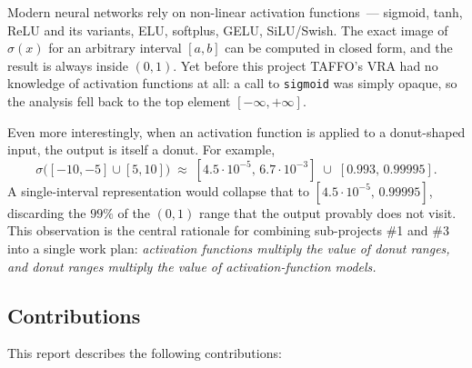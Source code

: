 \documentclass[11pt,a4paper]{article}
\theoremstyle{plain}
\begin{document}
Modern neural networks rely on non-linear activation functions~---
sigmoid, tanh, ReLU and its variants, ELU, softplus, GELU, SiLU/Swish.
The exact image of $\sigma(x)$ for an arbitrary interval $[a,b]$ can be
computed in closed form, and the result is always inside $(0,1)$. Yet
before this project TAFFO's VRA had no knowledge of activation
functions at all: a call to \texttt{sigmoid} was simply opaque, so the
analysis fell back to the top element $[-\infty,+\infty]$.

Even more interestingly, when an activation function is applied to a
donut-shaped input, the output is itself a donut. For example,
\[
\sigma\big([-10,-5]\cup[5,10]\big)\;\approx\;[4.5\cdot 10^{-5},\,6.7\cdot 10^{-3}]\;\cup\;[0.993,\,0.99995].
\]
A single-interval representation would collapse that to
$[4.5\cdot10^{-5},\,0.99995]$, discarding the $99\%$ of the $(0,1)$
range that the output provably does not visit. This observation is the
central rationale for combining sub-projects \#1 and \#3 into a single
work plan: \emph{activation functions multiply the value of donut
ranges, and donut ranges multiply the value of activation-function
models.}

\subsection{Contributions}
\label{sec:contributions}

This report describes the following contributions:
\end{document}
